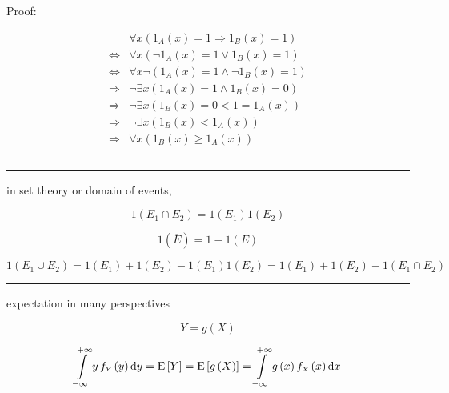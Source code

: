 \documentclass[
]{book}
\theoremstyle{definition}
\theoremstyle{definition}
\theoremstyle{definition}
\theoremstyle{definition}
\theoremstyle{remark}
\begin{document}
Proof:

\[
\begin{aligned}
 & \forall x\left(1_{A}\left(x\right)=1\Rightarrow1_{B}\left(x\right)=1\right)\\
\Leftrightarrow & \forall x\left(\neg1_{A}\left(x\right)=1\vee1_{B}\left(x\right)=1\right)\\
\Leftrightarrow & \forall x\neg\left(1_{A}\left(x\right)=1\wedge\neg1_{B}\left(x\right)=1\right)\\
\Rightarrow & \neg\exists x\left(1_{A}\left(x\right)=1\wedge1_{B}\left(x\right)=0\right)\\
\Rightarrow & \neg\exists x\left(1_{B}\left(x\right)=0<1=1_{A}\left(x\right)\right)\\
\Rightarrow & \neg\exists x\left(1_{B}\left(x\right)<1_{A}\left(x\right)\right)\\
\Rightarrow & \forall x\left(1_{B}\left(x\right)\ge1_{A}\left(x\right)\right)
\end{aligned}
\]

\[
\tag*{$\Box$}
\]

\begin{center}\rule{0.5\linewidth}{0.5pt}\end{center}

in set theory or domain of events,

\[
1\left(E_{{\scriptscriptstyle 1}}\cap E_{{\scriptscriptstyle 2}}\right)=1\left(E_{{\scriptscriptstyle 1}}\right)1\left(E_{{\scriptscriptstyle 2}}\right)
\]

\[
1\left(\overline{E}\right)=1-1\left(E\right)
\]

\[
1\left(E_{{\scriptscriptstyle 1}}\cup E_{{\scriptscriptstyle 2}}\right)=1\left(E_{{\scriptscriptstyle 1}}\right)+1\left(E_{{\scriptscriptstyle 2}}\right)-1\left(E_{{\scriptscriptstyle 1}}\right)1\left(E_{{\scriptscriptstyle 2}}\right)=1\left(E_{{\scriptscriptstyle 1}}\right)+1\left(E_{{\scriptscriptstyle 2}}\right)-1\left(E_{{\scriptscriptstyle 1}}\cap E_{{\scriptscriptstyle 2}}\right)
\]

\begin{center}\rule{0.5\linewidth}{0.5pt}\end{center}

expectation in many perspectives

\[
Y=g\left(X\right)
\]

\[
\intop\limits _{-\infty}^{+\infty}y\thinspace f_{{\scriptscriptstyle Y}}\left(y\right)\mathrm{d}y=\mathrm{E}\left[Y\right]=\mathrm{E}\left[g\left(X\right)\right]=\intop\limits _{-\infty}^{+\infty}g\left(x\right)f_{{\scriptscriptstyle X}}\left(x\right)\mathrm{d}x
\]
\end{document}
